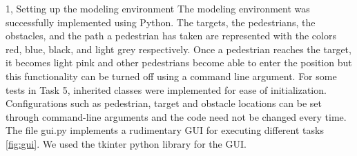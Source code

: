 \documentclass[10pt,a4paper]{article}
\begin{document}
\frontpage

\begin{task}{1, Setting up the modeling environment}
The modeling environment was successfully implemented using Python. The targets, the pedestrians, the obstacles, and the path a pedestrian has taken are represented with the colors red, blue, black, and light grey respectively. Once a pedestrian reaches the target, it becomes light pink and other pedestrians become able to enter the position but this functionality can be turned off using a command line argument. For some tests in Task 5, inherited classes were implemented for ease of initialization. Configurations such as pedestrian, target and obstacle locations can be set through command-line arguments and the code need not be changed every time. The file gui.py implements a rudimentary GUI for executing different tasks \ref{fig:gui}. We used the tkinter python library for the GUI.


\end{task}
\end{document}
